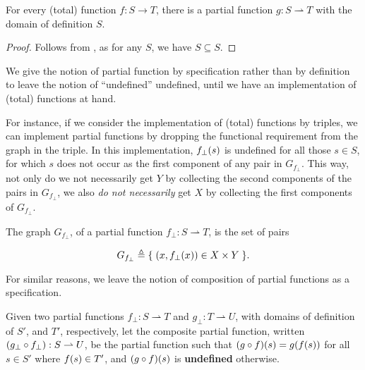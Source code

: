 \begin{theorem} \label{thm:total-has-partial} For every (total) function $f : S
\rightarrow T$, there is a partial function $g : S \rightharpoonup T$ with the
domain of definition $S$.  \end{theorem}

\begin{proof} Follows from , as for any $S$, we have
$S\subseteq S$.  \end{proof}

We give the notion of partial function by specification rather than by
definition to leave the notion of ``undefined'' undefined, until we have an
implementation of (total) functions at hand.

For instance, if we consider the implementation of (total) functions by
triples, we can implement partial functions by dropping the functional
requirement from the graph in the triple. In this implementation, $f_\bot\mathopen{}\left({s}\right)\mathclose{}$
is undefined for all those $s\in S$, for which $s$ does not occur as the first
component of any pair in $G_{f_\bot}$. This way, not only do we not necessarily
get $Y$ by collecting the second components of the pairs in $G_{f_\bot}$, we
also \emph{do not necessarily} get $X$ by collecting the first components of
$G_{f_\bot}$.

\begin{definition} The graph $G_{f_\bot}$, of a partial function $f_\bot : S
\rightharpoonup T$, is the set of pairs

$$G_{f_\bot} \triangleq \mathopen{}\left\{\mathrel{}{\mathopen{}\left({x,f_\bot\mathopen{}\left({x}\right)\mathclose{}}\right)\mathclose{}\in X \times Y}\mathrel{}\right\}\mathclose{}.$$

\end{definition}

For similar reasons, we leave the notion of composition of partial functions as
a specification.

\begin{specification} \label{spec:partial-composition} Given two partial
functions $f_\bot : S \rightharpoonup T$ and $g_\bot : T \rightharpoonup U$,
with domains of definition of $S'$, and $T'$, respectively, let the composite
partial function, written $\mathopen{}\left({g_\bot \circ f_\bot}\right)\mathclose{} : S \rightharpoonup U$, be
the partial function such that $\mathopen{}\left({g \circ f}\right)\mathclose{}\mathopen{}\left({s}\right)\mathclose{} = g\mathopen{}\left({f\mathopen{}\left({s}\right)\mathclose{}}\right)\mathclose{}$ for all $s\in
S'$ where $f\mathopen{}\left({s}\right)\mathclose{} \in T'$, and $\mathopen{}\left({g \circ f}\right)\mathclose{}\mathopen{}\left({s}\right)\mathclose{}$ is \textbf{undefined}
otherwise.  \end{specification}


